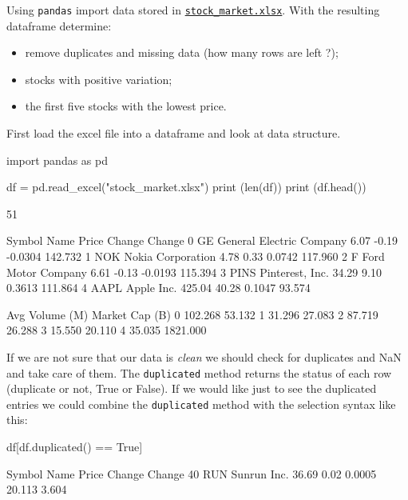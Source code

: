 \begin{question}
Using \texttt{pandas} import data stored in \href{https://drive.google.com/file/d/1Uu9lQorvzM-1xwRKPNszaSqlCYAiY-gr/view?usp=sharing}{\texttt{stock\_market.xlsx}}. With the resulting dataframe determine:
\begin{itemize}
\item remove duplicates and missing data (how many rows are left ?);
\item stocks with positive variation;
\item the first five stocks with the lowest price.
\end{itemize}
\end{question}

\cprotEnv\begin{solution}
First load the excel file into a dataframe and look at data structure.

\begin{ipython}
import pandas as pd

df = pd.read_excel("stock_market.xlsx")
print (len(df))
print (df.head())

51

  Symbol                      Name   Price  Change  Change%
0     GE  General Electric Company    6.07   -0.19  -0.0304     142.732
1    NOK         Nokia Corporation    4.78    0.33   0.0742     117.960
2      F        Ford Motor Company    6.61   -0.13  -0.0193     115.394
3   PINS           Pinterest, Inc.   34.29    9.10   0.3613     111.864
4   AAPL                Apple Inc.  425.04   40.28   0.1047      93.574

   Avg Volume (M)  Market Cap (B)
0         102.268          53.132
1          31.296          27.083
2          87.719          26.288
3          15.550          20.110
4          35.035        1821.000
\end{ipython}
        
If we are not sure that our data is \emph{clean} we should check for duplicates and NaN and take care of them. The \texttt{duplicated} method returns the status of each row (duplicate or not, True or False). If we would like just to see the duplicated entries we could combine the \texttt{duplicated} method with the selection syntax like this:

\begin{ipython}
df[df.duplicated() == True]

   Symbol         Name  Price  Change  Change%
40    RUN  Sunrun Inc.  36.69    0.02   0.0005      20.113           3.604


\end{ipython}
\end{solution}
